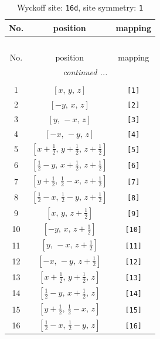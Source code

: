 \documentclass[fleqn,8pt]{jsarticle}
\begin{document}
\begin{longtable}{ccc}
\caption{Wyckoff site: {\tt 16d}, site symmetry: {\tt 1}}
 \\
 \hline \hline
No. & position & mapping \\ \hline \endfirsthead

\multicolumn{2}{l}{\tablename\ \thetable{}} \\
 \hline \hline
No. & position & mapping \\ \hline \endhead

 \hline \hline
\multicolumn{2}{r}{\footnotesize\it continued ...} \\ \endfoot

 \hline \hline
\multicolumn{2}{r}{} \\ \endlastfoot

1 & $\left[ x,\, y,\, z \right]$ & {\tt [1]} \\ \hline
2 & $\left[ - y,\, x,\, z \right]$ & {\tt [2]} \\ \hline
3 & $\left[ y,\, - x,\, z \right]$ & {\tt [3]} \\ \hline
4 & $\left[ - x,\, - y,\, z \right]$ & {\tt [4]} \\ \hline
5 & $\left[ x + \frac{1}{2},\, y + \frac{1}{2},\, z + \frac{1}{2} \right]$ & {\tt [5]} \\ \hline
6 & $\left[ \frac{1}{2} - y,\, x + \frac{1}{2},\, z + \frac{1}{2} \right]$ & {\tt [6]} \\ \hline
7 & $\left[ y + \frac{1}{2},\, \frac{1}{2} - x,\, z + \frac{1}{2} \right]$ & {\tt [7]} \\ \hline
8 & $\left[ \frac{1}{2} - x,\, \frac{1}{2} - y,\, z + \frac{1}{2} \right]$ & {\tt [8]} \\ \hline
9 & $\left[ x,\, y,\, z + \frac{1}{2} \right]$ & {\tt [9]} \\ \hline
10 & $\left[ - y,\, x,\, z + \frac{1}{2} \right]$ & {\tt [10]} \\ \hline
11 & $\left[ y,\, - x,\, z + \frac{1}{2} \right]$ & {\tt [11]} \\ \hline
12 & $\left[ - x,\, - y,\, z + \frac{1}{2} \right]$ & {\tt [12]} \\ \hline
13 & $\left[ x + \frac{1}{2},\, y + \frac{1}{2},\, z \right]$ & {\tt [13]} \\ \hline
14 & $\left[ \frac{1}{2} - y,\, x + \frac{1}{2},\, z \right]$ & {\tt [14]} \\ \hline
15 & $\left[ y + \frac{1}{2},\, \frac{1}{2} - x,\, z \right]$ & {\tt [15]} \\ \hline
16 & $\left[ \frac{1}{2} - x,\, \frac{1}{2} - y,\, z \right]$ & {\tt [16]} \\
\end{longtable}
\end{document}
